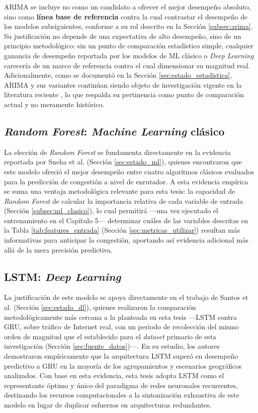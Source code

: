 \documentclass[12pt]{report}
\begin{document}
ARIMA se incluye no como un candidato a ofrecer el mejor desempeño absoluto, sino como \textbf{línea base de referencia} contra la cual contrastar el desempeño de los modelos subsiguientes, conforme a su rol descrito en la Sección \ref{subsec:arima}. Su justificación no depende de una expectativa de alto desempeño, sino de un principio metodológico: sin un punto de comparación estadístico simple, cualquier ganancia de desempeño reportada por los modelos de ML clásico o \textit{Deep Learning} carecería de un marco de referencia contra el cual dimensionar 
su magnitud real. Adicionalmente, como se documentó en la Sección \ref{sec:estado_estadistica}, ARIMA y sus variantes continúan siendo objeto de investigación vigente en la literatura reciente \cite{kochetkova2023}, lo que respalda su pertinencia como punto de comparación actual y no meramente histórico.

\subsection*{\textit{Random Forest}: \textit{Machine Learning} clásico}

La elección de \textit{Random Forest} se fundamenta directamente en la evidencia reportada por Sneha et al. \cite{sneha2020} (Sección \ref{sec:estado_ml}), quienes encontraron que este modelo ofreció el mejor desempeño entre cuatro algoritmos clásicos evaluados para la predicción de congestión a nivel de enrutador. A esta evidencia empírica se suma una ventaja metodológica relevante para esta tesis: la capacidad de \textit{Random Forest} de calcular la importancia relativa de cada variable de entrada (Sección \ref{subsec:ml_clasico}), lo cual permitirá 
---una vez ejecutado el entrenamiento en el Capítulo 5--- determinar cuáles de las variables descritas en la Tabla \ref{tab:features_entrada} (Sección \ref{sec:metricas_utilizar}) resultan más informativas para anticipar la congestión, aportando así evidencia adicional más allá de la mera precisión predictiva.

\subsection*{LSTM: \textit{Deep Learning}}

La justificación de este modelo se apoya directamente en el trabajo de Santos et al. \cite{santos2022} (Sección \ref{sec:estado_dl}), quienes realizaron la comparación metodológicamente más cercana a la planteada en esta tesis ---LSTM contra GRU, sobre tráfico de Internet real, con un periodo de recolección del mismo orden de magnitud que el establecido para el \textit{dataset} primario de esta investigación (Sección \ref{sec:fuente_datos})---. En su estudio, los autores demostraron empíricamente que la arquitectura LSTM superó en desempeño predictivo a 
GRU en la mayoría de los agrupamientos y escenarios geográficos analizados. Con base en esta evidencia, esta tesis adopta LSTM como el representante óptimo y único del paradigma de redes neuronales recurrentes, destinando los recursos computacionales a la sintonización exhaustiva de este modelo en lugar de duplicar esfuerzos en arquitecturas redundantes.
\end{document}
